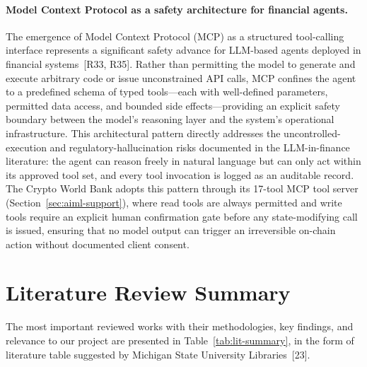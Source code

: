 \documentclass[12pt,a4paper]{report}
\begin{document}
\paragraph{Model Context Protocol as a safety architecture for financial agents.}
The emergence of Model Context Protocol (MCP) as a structured tool-calling interface represents a significant safety advance for LLM-based agents deployed in financial systems~[R33, R35]. Rather than permitting the model to generate and execute arbitrary code or issue unconstrained API calls, MCP confines the agent to a predefined schema of typed tools---each with well-defined parameters, permitted data access, and bounded side effects---providing an explicit safety boundary between the model's reasoning layer and the system's operational infrastructure. This architectural pattern directly addresses the uncontrolled-execution and regulatory-hallucination risks documented in the LLM-in-finance literature: the agent can reason freely in natural language but can only act within its approved tool set, and every tool invocation is logged as an auditable record. The Crypto World Bank adopts this pattern through its 17-tool MCP tool server (Section~\ref{sec:aiml-support}), where read tools are always permitted and write tools require an explicit human confirmation gate before any state-modifying call is issued, ensuring that no model output can trigger an irreversible on-chain action without documented client consent.

\section{Literature Review Summary}

The most important reviewed works with their methodologies, key findings, and relevance to our project are presented in Table~\ref{tab:lit-summary}, in the form of literature table suggested by Michigan State University Libraries~[23].
\end{document}
